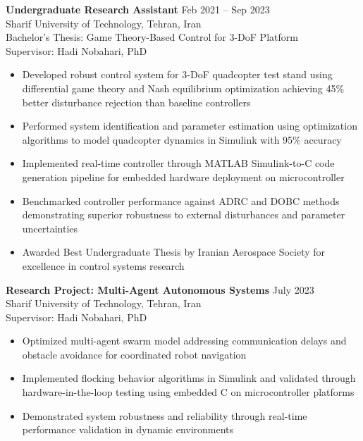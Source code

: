 \documentclass[12pt]{article}
\begin{document}
\vspace{4pt}

\noindent
\textbf{Undergraduate Research Assistant} \hfill Feb 2021 -- Sep 2023 \\
Sharif University of Technology, Tehran, Iran \\
Bachelor's Thesis: Game Theory-Based Control for 3-DoF Platform \\
Supervisor: Hadi Nobahari, PhD

\begin{itemize} \itemsep 1pt
	\item Developed robust control system for 3-DoF quadcopter test stand using differential game theory and Nash equilibrium optimization achieving 45\% better disturbance rejection than baseline controllers
	\item Performed system identification and parameter estimation using optimization algorithms to model quadcopter dynamics in Simulink with 95\% accuracy
	\item Implemented real-time controller through MATLAB Simulink-to-C code generation pipeline for embedded hardware deployment on microcontroller
	\item Benchmarked controller performance against ADRC and DOBC methods demonstrating superior robustness to external disturbances and parameter uncertainties
	\item Awarded Best Undergraduate Thesis by Iranian Aerospace Society for excellence in control systems research
\end{itemize}

\vspace{4pt}

\noindent
\textbf{Research Project: Multi-Agent Autonomous Systems} \hfill July 2023 \\
Sharif University of Technology, Tehran, Iran \\
Supervisor: Hadi Nobahari, PhD

\begin{itemize} \itemsep 1pt
	\item Optimized multi-agent swarm model addressing communication delays and obstacle avoidance for coordinated robot navigation
	\item Implemented flocking behavior algorithms in Simulink and validated through hardware-in-the-loop testing using embedded C on microcontroller platforms
	\item Demonstrated system robustness and reliability through real-time performance validation in dynamic environments
\end{itemize}
\end{document}
